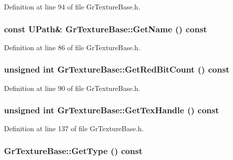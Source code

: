 \begin{CompactItemize}
Definition at line 94 of file GrTextureBase.h.\hypertarget{class_gr_texture_base_7e10acc5b93473c8149f3d7fa12fb905}{
\subsubsection[{GetName}]{\setlength{\rightskip}{0pt plus 5cm}const {\bf UPath}\& GrTextureBase::GetName () const}}
\label{class_gr_texture_base_7e10acc5b93473c8149f3d7fa12fb905}




Definition at line 86 of file GrTextureBase.h.\hypertarget{class_gr_texture_base_d3d44c7785028f08063c8c446d0e91a1}{
\subsubsection[{GetRedBitCount}]{\setlength{\rightskip}{0pt plus 5cm}unsigned int GrTextureBase::GetRedBitCount () const}}
\label{class_gr_texture_base_d3d44c7785028f08063c8c446d0e91a1}




Definition at line 90 of file GrTextureBase.h.\hypertarget{class_gr_texture_base_8be868ce1a1917e37ea1e72d2436a9b2}{
\subsubsection[{GetTexHandle}]{\setlength{\rightskip}{0pt plus 5cm}unsigned int GrTextureBase::GetTexHandle () const}}
\label{class_gr_texture_base_8be868ce1a1917e37ea1e72d2436a9b2}




Definition at line 137 of file GrTextureBase.h.\hypertarget{class_gr_texture_base_d0b985795ad1856b64d17b8404b2ca08}{
\subsubsection[{GetType}]{ GrTextureBase::GetType () const}}
\label{class_gr_texture_base_d0b985795ad1856b64d17b8404b2ca08}





\end{CompactItemize}
